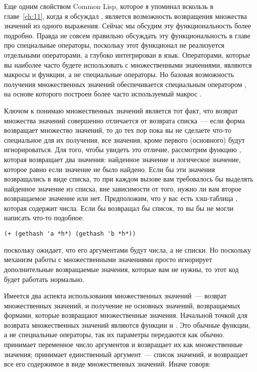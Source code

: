 Еще одним свойством Common Lisp, которое я упоминал вскользь в главе~\ref{ch:11}, когда я
обсуждал , является возможность возвращения множества значений из одного
выражения. Сейчас мы обсудим эту функциональность более подробно. Правда не совсем
правильно обсуждать эту функциональность в главе про специальные операторы, поскольку этот
функционал не реализуется отдельными операторами, а глубоко интегрирован в
язык. Операторами, которые вы наиболее часто будете использовать с множественными
значениями, являются макросы и функции, а не специальные операторы.  Но базовая
возможность получения множественных значений обеспечивается специальным оператором
, на основе которого построен более часто используемый макрос
.

Ключом к понимаю множественных значений является тот факт, что возврат множества значений
совершенно отличается от возврата списка~--- если форма возвращает множество значений, то
до тех пор пока вы не сделаете что-то специальное для их получения, все значения, кроме
первого (основного) будут игнорироваться.  Для того, чтобы увидеть это отличие, рассмотрим
функцию , которая возвращает два значения: найденное значение и логическое
значение, которое равно  если значение не было найдено.  Если бы эти значения
возвращались в виде списка, то при каждом вызове  вам требовалось бы
выделять найденное значение из списка, вне зависимости от того, нужно ли вам второе
возвращаемое значение или нет.  Предположим, что у вас есть хэш-таблица ,
которая содержит числа.  Если бы  возвращал бы список, то вы бы не могли
написать что-то подобное:

\begin{lstlisting}
(+ (gethash 'a *h*) (gethash 'b *h*))
\end{lstlisting}

поскольку \code{+} ожидает, что его аргументами будут числа, а не списки. Но поскольку
механизм работы с множественными значениями просто игнорирует дополнительные возвращаемые
значения, которые вам не нужны, то этот код будет работать нормально.

Имеется два аспекта использования множественных значений~--- возврат множественных
значений, и получение не основных значений, возвращаемых формами, которые возвращают
множественные значения.  Начальной точкой для возврата множественных значений являются
функции  и .  Это обычные функции, а не специальные
операторы, так их параметры передаются как обычно.   принимает переменное
число аргументов и возвращает их как множественные значения;  принимает
единственный аргумент~--- список значений, и возвращает все его содержимое в виде
множественных значений.  Иначе говоря:

